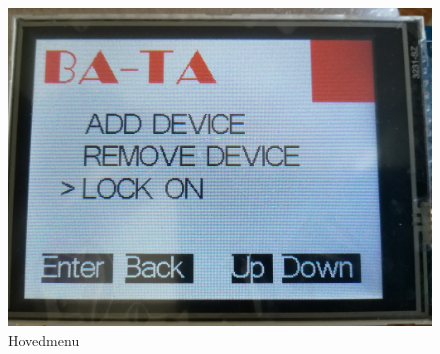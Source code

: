 \begin{figure}[H]
	\centering
	\includegraphics[width = 300 pt]{Img/start.jpg}
	\caption{Hovedmenu}
	\label{fig:start}
\end{figure}

